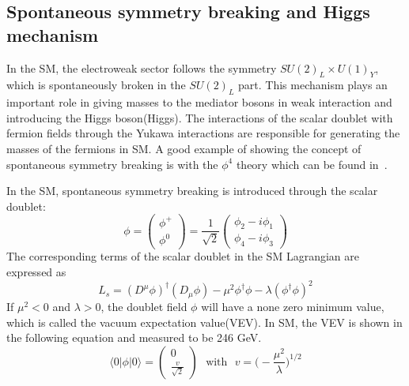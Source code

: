 \subsection{Spontaneous symmetry breaking and Higgs mechanism}

In the SM, the electroweak sector follows the symmetry $SU(2)_{L}\times U(1)_{Y}$, which is spontaneously broken in the $SU(2)_{L}$ part. This mechanism plays an important role in giving masses to the mediator bosons in weak interaction and introducing the Higgs boson(Higgs).  The interactions of the scalar doublet with fermion fields through the Yukawa interactions are responsible for generating the masses of the fermions in SM. A good example of showing the concept of spontaneous symmetry breaking is with the $\phi^{4}$ theory which can be found in~\cite{Peskin:1995ev}.

In the SM, spontaneous symmetry breaking is introduced through the scalar doublet:
\[
\phi=
\begin{pmatrix}
\phi^{+}\\
\phi^{0}
\end{pmatrix}
=\frac{1}{\sqrt{2}}
\begin{pmatrix}
\phi_{2}-i\phi_{1}\\
\phi_{4}-i\phi_{3}
\end{pmatrix}
\]
The corresponding terms of the scalar doublet in the SM Lagrangian are expressed as
\begin{equation}
L_{s}=(D^{\mu}\phi)^{\dagger}(D_{\mu}\phi)-\mu^{2}\phi^{\dagger}\phi-\lambda(\phi^{\dagger}\phi)^{2}
\end{equation}
If $\mu^{2}<0$ and $\lambda>0$, the doublet field $\phi$ will have a none zero minimum value, which is called the vacuum expectation value(VEV). In SM, the VEV is shown in the following equation and measured to be 246 GeV.
\begin{equation}\label{vev}
\langle 0 | \phi | 0 \rangle   =
\begin{pmatrix}
0\\
\frac{v}{\sqrt{2}}
\end{pmatrix}
~~~\textrm{with} ~~~  v=
\bigg(-\frac{\mu^{2}}{\lambda}\bigg)^{1/2}
\end{equation}

